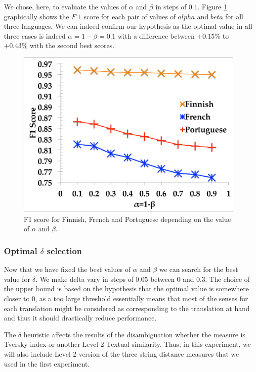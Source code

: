 \documentclass[10pt, a4paper]{article}
\begin{document}
We chose, here, to evaluate the values of \(\alpha\) and \(\beta\) in steps of \(0.1\). Figure \ref{fig.1} graphically shows the \(F\_1\) score for each pair of values of \(alpha\) and \(beta\) for all three languages. We can indeed confirm our hypothesis as the optimal value in all three cases is indeed \(\alpha=1-\beta=0.1\) with a difference between \(+0.15\%\) to \(+0.43\%\) with the second best scores.
	
\begin{figure}\centering
\includegraphics[width=0.64\columnwidth]{alphabetafig}
\caption{F1 score for Finnish, French and Portuguese depending on the value of \(\alpha\) and \(\beta\).}
\label{fig.1}
\end{figure}

\subsubsection{Optimal \(\delta\) selection}
Now that we have fixed the best values of \(\alpha\) and \(\beta\) we can search for the best value for \(\delta\). We make delta vary in steps of \(0.05\) between \(0\) and \(0.3\). The choice of the upper bound is based on the hypothesis that the optimal value is somewhere closer to 0, as a too large threshold essentially means that most of the senses for each translation might be considered as corresponding to the translation at hand and thus it should drastically reduce performance. 

The \(\delta\) heuristic affects the results of the disambiguation whether the measure is  Tversky index or another Level 2 Textual similarity. Thus, in this experiment, we will also include Level 2 version of the three string distance measures that we used in the first experiment.
\end{document}
